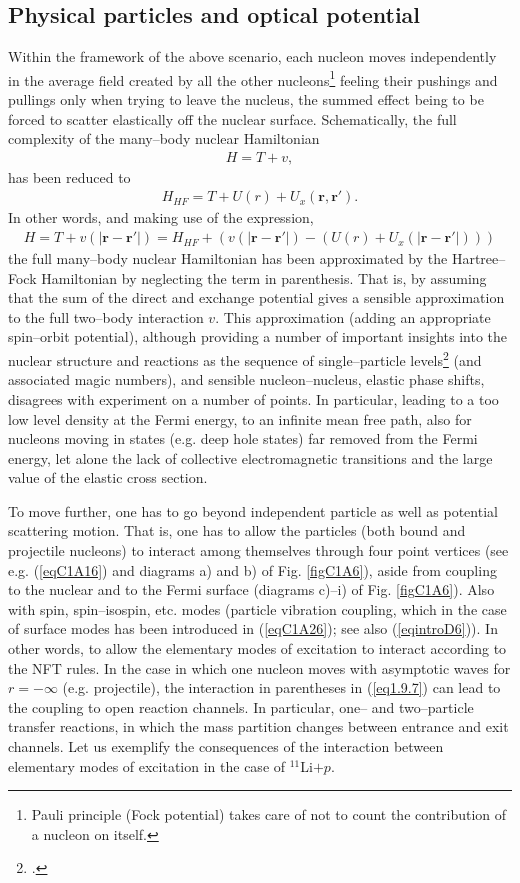 \subsection{Physical particles and optical potential}\label{sect1.9.2}
Within the framework of the above scenario, each nucleon moves independently in the average field created by all the other nucleons\footnote{Pauli principle (Fock potential) takes care of not to count the contribution of a nucleon on itself.} feeling their pushings and pullings only when trying to leave the nucleus, the summed effect being to be forced to scatter elastically off the nuclear surface. Schematically, the full complexity of the many--body nuclear Hamiltonian
\begin{align}
H=T+v,
\end{align}
has been reduced to
\begin{align}
H_{HF}=T+U(r)+U_x(\mathbf r,\mathbf r').
\end{align}
In other words, and making use of the expression,
\begin{align}\label{eq1.9.7}
H=T+v(|\mathbf r- \mathbf r'|)=H_{HF}+\left(v(|\mathbf r- \mathbf r'|)-(U(r)+U_x(|\mathbf r- \mathbf r'|))\right)
\end{align}
the full many--body nuclear Hamiltonian has been approximated by the Hartree--Fock Hamiltonian
by neglecting the term in parenthesis. That is, by assuming that the sum of the direct and exchange potential gives a sensible approximation to the full two--body interaction $v$. This approximation (adding an appropriate spin--orbit potential), although providing a number of important insights into the nuclear structure and reactions as the sequence of single--particle levels\footnote{\cite{Mayer:55}.} (and associated magic numbers), and sensible nucleon--nucleus, elastic phase shifts, disagrees with experiment on a number of points. In particular, leading to a too low level density at the Fermi energy,  to an infinite mean free path, also for nucleons moving in states (e.g. deep hole states) far removed from the Fermi energy, let alone the lack of collective electromagnetic transitions and the large value of the elastic cross section.

To move further, one has to go beyond independent particle as well as  potential scattering motion. That is, one has  to allow the particles (both bound and projectile nucleons) to interact among themselves through four point vertices (see e.g. (\ref{eqC1A16}) and diagrams a) and b) of Fig. \ref{figC1A6}), aside from coupling to the nuclear and to the  Fermi surface (diagrams c)--i) of Fig. \ref{figC1A6}). Also with spin, spin--isospin, etc. modes (particle vibration coupling, which in the case of surface modes has been introduced in (\ref{eqC1A26}); see also (\ref{eqintroD6})). In other words, to allow the elementary modes of excitation to interact according to the NFT rules. In the case in which  one nucleon moves with asymptotic waves for  $r=-\infty$ (e.g. projectile), the  interaction in parentheses in (\ref{eq1.9.7}) can lead to the coupling to open reaction channels. In particular, one-- and two--particle transfer reactions, in which the mass partition changes between entrance and exit channels.
Let us exemplify the consequences of the interaction between  elementary modes of excitation in the case of $^{11}$Li$+p$.
